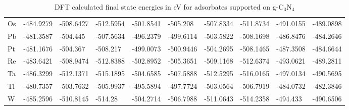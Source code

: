 \begin{table}[h]
{\begin{tabular}{*{10}{l}}
    Os & -484.9279 & -508.6427 & -512.5954 & -501.8541 & -505.208  & -507.8334 & -511.8734 & -491.0155 & -489.0898 \\
    Pb & -481.3587 & -504.445  & -507.5634 & -496.2379 & -499.6114 & -503.5822 & -508.1698 & -486.8476 & -484.2646 \\
    Pt & -481.1676 & -504.367  & -508.217  & -499.0073 & -500.9446 & -504.2695 & -508.1465 & -487.3508 & -484.6644 \\
    Re & -483.6421 & -508.9474 & -512.8388 & -502.8952 & -505.3651 & -509.1168 & -512.6374 & -493.0621 & -489.2811 \\
    Ta & -486.3299 & -512.1371 & -515.1895 & -504.6585 & -507.5888 & -512.5295 & -516.0165 & -497.0134 & -490.5695 \\
    Tl & -480.7357 & -503.7632 & -505.9937 & -495.5894 & -497.7724 & -503.0564 & -506.7919 & -484.0732 & -482.3846 \\
    W  & -485.2596 & -510.8145 & -514.28   & -504.2714 & -506.7988 & -511.0643 & -514.2358 & -494.433  & -490.6506 \\
    \hline
  \end{tabular}
  }
  \caption{DFT calculated final state energies in eV for adsorbates supported on g-C$_3$N$_4$}
  \label{si_table4}
\end{table}


